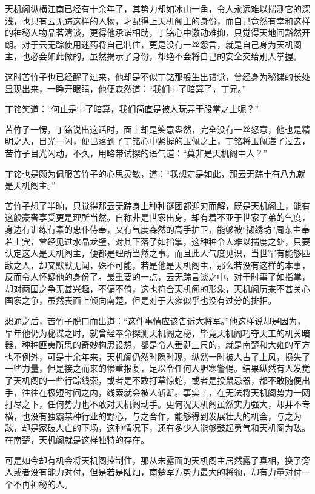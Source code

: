 天机阁纵横江南已经有十余年了，其势力却如冰山一角，令人永远难以揣测它的深浅，也只有云无踪这样的人物，才配得上天机阁主的身份，而自己竟然有幸和这样的神秘人物品茗清谈，更得他承诺相助，丁铭心中激动难抑，只觉得天地间豁然开朗。对于云无踪使用迷药将自己制住，更是没有一丝怨言，就是自己身为天机阁主，也必会如此做的，虽然揭示了身份，却绝不会将自己的安全交给别人掌握。

这时苦竹子也已经醒了过来，他却是不似丁铭那般生出错觉，曾经身为秘谍的长处显现出来，一睁开眼睛，他便森然道：“我们中了暗算了，丁兄。”

丁铭笑道：“何止是中了暗算，我们简直是被人玩弄于股掌之上呢？”

苦竹子一愣，丁铭说出这话时，面上却是笑意盎然，完全没有一丝怒意，他也是精明之人，目光一闪，便已落到了丁铭心中紧握的玉佩之上，丁铭将玉佩递了过去，苦竹子目光闪动，不久，用略带试探的语气道：“莫非是天机阁中人？”

丁铭也是颇为佩服苦竹子的心思灵敏，道：“我想定是如此，那云无踪十有八九就是天机阁主。”

苦竹子想了半晌，只觉得那云无踪身上种种谜团都迎刃而解，既是天机阁主，能有这般豪奢享受更是理所当然。自称非是世家出身，却有着不亚于世家子弟的气度，身边有训练有素的忠仆侍奉，又有气度森然的高手护卫，能够被“撷绣坊”周东主奉若上宾，曾经见过水晶龙璧，对其下落了如指掌，这种种令人难以揣度之处，只要认定这人是天机阁主，便都是理所当然之事。而且此人气度见识，当世罕有能够匹敌之人，却又默默无闻，殊不可能，若是他是天机阁主，那么若没有这样的本事，反而令人怀疑他的身份了。最重要的一点，云无踪言谈之中，对于时事了如指掌，却对两国之争无甚兴趣，不偏不倚，这也符合天机阁的形象，天机阁历来不甚关心国家之争，虽然表面上倾向南楚，但是对于大雍似乎也没有过分的排拒。

想通之后，苦竹子脱口而出道：“这件事情应该告诉大将军。”他这样说却是因为，早年他仍为秘谍之时，就曾经奉命探测天机阁之秘，毕竟天机阁巧夺天工的机关暗器，种种匪夷所思的奇妙构思设想，都是令人垂涎三尺的，就是南楚和大雍的军方也不例外，可是十余年来，天机阁仍然时隐时现，纵然一时被人占了上风，损失了一些力量，但是接之而来的惨重报复，足以令任何人胆寒警惕。结果纵然有人发觉了天机阁的一些行踪线索，或者是不敢打草惊蛇，或者是投鼠忌器，都不敢随便出手，往往在极短时间之内，线索就会被人斩断。事实上，在无法将天机阁势力一网打尽之下，任何势力也不敢对天机阁动手。更何况天机阁虽然实力强大，却并不专横，也没有独霸某种行业的野心，与之合作，能够得到发展壮大的机会，与之为敌，却是家破人亡的下场，这种情况下，还有多少人能够鼓起勇气和天机阁为敌。在南楚，天机阁就是这样独特的存在。

可是如今却有机会将天机阁控制住，那从未露面的天机阁主居然露了真相，换了旁人或者没有能力对付，但是若是陆灿，南楚军方势力最大的将领，却有力量对付一个不再神秘的人。

